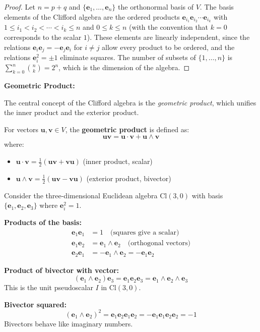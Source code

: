 \begin{proof}
Let $n = p + q$ and $\{\mathbf{e}_1, \ldots, \mathbf{e}_n\}$ the orthonormal basis of $V$. The basis elements of the Clifford algebra are the ordered products $\mathbf{e}_{i_1} \mathbf{e}_{i_2} \cdots \mathbf{e}_{i_k}$ with $1 \leq i_1 < i_2 < \cdots < i_k \leq n$ and $0 \leq k \leq n$ (with the convention that $k = 0$ corresponds to the scalar $1$). These elements are linearly independent, since the relations $\mathbf{e}_i \mathbf{e}_j = -\mathbf{e}_j \mathbf{e}_i$ for $i \neq j$ allow every product to be ordered, and the relations $\mathbf{e}_i^2 = \pm 1$ eliminate squares. The number of subsets of $\{1, \ldots, n\}$ is $\sum_{k=0}^{n} \binom{n}{k} = 2^n$, which is the dimension of the algebra.
\end{proof}

\textbf{Geometric Product:}

The central concept of the Clifford algebra is the \textit{geometric product}, which unifies the inner product and the exterior product.

\begin{definition}\label{def:producto_geometrico_cnn}
For vectors $\mathbf{u}, \mathbf{v} \in V$, the \textbf{geometric product} is defined as:
\[\mathbf{u}\mathbf{v} = \mathbf{u} \cdot \mathbf{v} + \mathbf{u} \wedge \mathbf{v}\]
where:
\begin{itemize}
    \item $\mathbf{u} \cdot \mathbf{v} = \frac{1}{2}(\mathbf{u}\mathbf{v} + \mathbf{v}\mathbf{u})$ (inner product, scalar)
    \item $\mathbf{u} \wedge \mathbf{v} = \frac{1}{2}(\mathbf{u}\mathbf{v} - \mathbf{v}\mathbf{u})$ (exterior product, bivector)
\end{itemize}
\end{definition}

\begin{example}\label{ex:productos_cl30}
Consider the three-dimensional Euclidean algebra $\text{Cl}(3,0)$ with basis $\{\mathbf{e}_1, \mathbf{e}_2, \mathbf{e}_3\}$ where $\mathbf{e}_i^2 = 1$.

\textbf{Products of the basis:}
\begin{align}
\mathbf{e}_1 \mathbf{e}_1 &= 1 \quad \text{(squares give a scalar)} \\
\mathbf{e}_1 \mathbf{e}_2 &= \mathbf{e}_1 \wedge \mathbf{e}_2 \quad \text{(orthogonal vectors)} \\
\mathbf{e}_2 \mathbf{e}_1 &= -\mathbf{e}_1 \wedge \mathbf{e}_2 = -\mathbf{e}_1 \mathbf{e}_2
\end{align}

\textbf{Product of bivector with vector:}
\[(\mathbf{e}_1 \wedge \mathbf{e}_2) \mathbf{e}_3 = \mathbf{e}_1 \mathbf{e}_2 \mathbf{e}_3 = \mathbf{e}_1 \wedge \mathbf{e}_2 \wedge \mathbf{e}_3\]
This is the unit pseudoscalar $I$ in $\text{Cl}(3,0)$.

\textbf{Bivector squared:}
\[(\mathbf{e}_1 \wedge \mathbf{e}_2)^2 = \mathbf{e}_1 \mathbf{e}_2 \mathbf{e}_1 \mathbf{e}_2 = -\mathbf{e}_1 \mathbf{e}_1 \mathbf{e}_2 \mathbf{e}_2 = -1\]
Bivectors behave like imaginary numbers.
\end{example}

